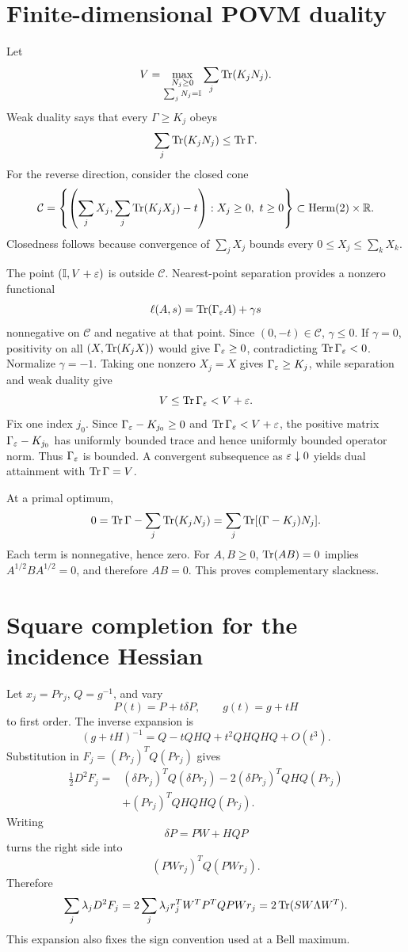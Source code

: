 \section{Finite-dimensional POVM duality}
\label{app:duality}

Let
\[
V=\max_{\substack{N_j\ge0\\\sum_jN_j=\mathbb I}}
\sum_j\operatorname{Tr}(K_jN_j).
\]
Weak duality says that every \(\Gamma\ge K_j\) obeys
\[
\sum_j\operatorname{Tr}(K_jN_j)\le\operatorname{Tr}\Gamma.
\]
For the reverse direction, consider the closed cone
\[
\mathcal C=
\left\{\left(\sum_jX_j,\sum_j\operatorname{Tr}(K_jX_j)-t\right):
X_j\ge0,\ t\ge0\right\}
\subset\operatorname{Herm}(2)\times\mathbb R.
\]
Closedness follows because convergence of \(\sum_jX_j\) bounds every
\(0\le X_j\le\sum_kX_k\).

The point \((\mathbb I,V+\varepsilon)\) is outside \(\mathcal C\). Nearest-point
separation provides a nonzero functional
\[
\ell(A,s)=\operatorname{Tr}(\Gamma_\varepsilon A)+\gamma s
\]
nonnegative on \(\mathcal C\) and negative at that point. Since
\((0,-t)\in\mathcal C\), \(\gamma\le0\). If \(\gamma=0\), positivity on all
\((X,\operatorname{Tr}(K_jX))\) would give \(\Gamma_\varepsilon\ge0\), contradicting
\(\operatorname{Tr}\Gamma_\varepsilon<0\). Normalize \(\gamma=-1\). Taking one nonzero \(X_j=X\)
gives \(\Gamma_\varepsilon\ge K_j\), while separation and weak duality give
\[
V\le\operatorname{Tr}\Gamma_\varepsilon<V+\varepsilon.
\]
Fix one index \(j_0\). Since
\(\Gamma_\varepsilon-K_{j_0}\ge0\) and \(\operatorname{Tr}\Gamma_\varepsilon<V+\varepsilon\), the positive
matrix \(\Gamma_\varepsilon-K_{j_0}\) has uniformly bounded trace and hence uniformly
bounded operator norm. Thus \(\Gamma_\varepsilon\) is bounded. A convergent
subsequence as \(\varepsilon\downarrow0\) yields dual attainment with
\(\operatorname{Tr}\Gamma=V\).

At a primal optimum,
\[
0=\operatorname{Tr}\Gamma-\sum_j\operatorname{Tr}(K_jN_j)
=\sum_j\operatorname{Tr}[(\Gamma-K_j)N_j].
\]
Each term is nonnegative, hence zero. For \(A,B\ge0\),
\(\operatorname{Tr}(AB)=0\) implies \(A^{1/2}BA^{1/2}=0\), and therefore \(AB=0\).
This proves complementary slackness.

\section{Square completion for the incidence Hessian}
\label{app:square-completion}

Let \(x_j=Pr_j\), \(Q=g^{-1}\), and vary
\[
P(t)=P+t\delta P,\qquad g(t)=g+tH
\]
to first order. The inverse expansion is
\[
(g+tH)^{-1}
=Q-tQHQ+t^2QHQHQ+O(t^3).
\]
Substitution in \(F_j=(P r_j)^TQ(P r_j)\) gives
\[
\begin{aligned}
\frac12D^2F_j
={}&(\delta P r_j)^TQ(\delta P r_j)
-2(\delta P r_j)^TQHQ(Pr_j)\\
&+(Pr_j)^TQHQHQ(Pr_j).
\end{aligned}
\]
Writing
\[
\delta P=PW+HQ P
\]
turns the right side into
\[
(PWr_j)^TQ(PWr_j).
\]
Therefore
\[
\sum_j\lambda_jD^2F_j
=2\sum_j\lambda_jr_j^TW^TP^TQPW r_j
=2\operatorname{Tr}(SW\Lambda W^T).
\]
This expansion also fixes the sign convention used at a Bell maximum.


